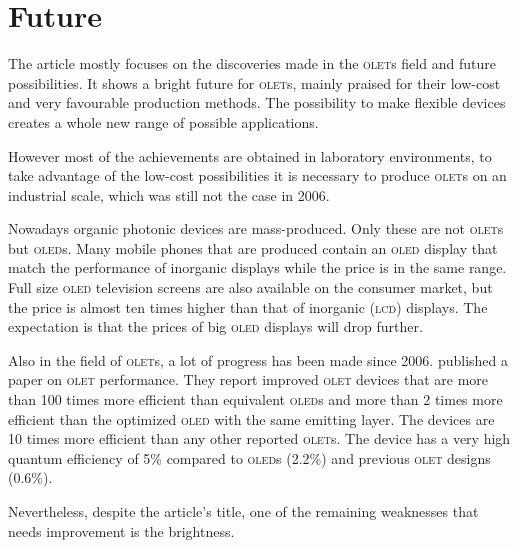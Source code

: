 \section{Future}\label{sec:future}
The article mostly focuses on the discoveries made in the \textsc{olet}s field and future possibilities. It shows a bright future for \textsc{olet}s, mainly praised for their low-cost and very favourable production methods. The possibility to make flexible devices creates a whole new range of possible applications.

However most of the achievements are obtained in laboratory environments, to take advantage of the low-cost possibilities it is necessary to produce \textsc{olet}s on an industrial scale, which was still not the case in 2006.

Nowadays organic photonic devices are mass-produced. Only these are not \textsc{olet}s but \textsc{oled}s. Many mobile phones that are produced contain an \textsc{oled} display that match the performance of inorganic displays while the price is in the same range. Full size \textsc{oled} television screens are also available on the consumer market, but the price is almost ten times higher than that of inorganic (\textsc{lcd}) displays. The expectation is that the prices of big \textsc{oled} displays will drop further. 

Also in the field of \textsc{olet}s, a lot of progress has been made since 2006. \citet{Capelli} published a paper on \textsc{olet} performance. They report improved \textsc{olet} devices that are more than 100 times more efficient than equivalent \textsc{oled}s and more than 2 times more efficient than the optimized \textsc{oled} with the same emitting layer. The devices are 10 times more efficient than any other reported \textsc{olet}s. The device has a very high quantum efficiency of 5\% compared to \textsc{oled}s (2.2\%) and previous \textsc{olet} designs (0.6\%). 

Nevertheless, despite the article's title, one of the remaining weaknesses that needs improvement is the brightness.
